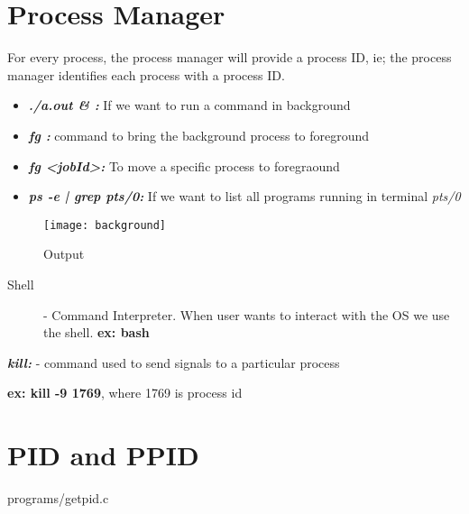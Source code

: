 \documentclass[11pt,fleqn]{book} %
\begin{document}
\section{Process Manager}
For every process, the process manager will provide a process ID, ie; the process manager identifies each process with a process ID.

\begin{myremark}{}
\begin{itemize}
	\item \textit{\textbf{./a.out \& :}} If we want to run a command in background
	
	\item \textit{\textbf{fg :}} command to bring the background process to foreground
	
	\item \textit{\textbf{fg <jobId>: }} To move a specific process to foregraound
	
	\item \textit{\textbf{ps -e | grep pts/0: }} If we want to list all programs running in terminal \textit{pts/0}

\end{itemize}
\end{myremark}

\begin{figure}[h]
\centering\texttt{[image: background]}
\caption{Output}
\end{figure}

\begin{description}
	\item[Shell] - Command Interpreter. When user wants to interact with the OS we use the shell. \textbf{ex: bash}
\end{description}


\begin{myremark}{}
\textbf{\textit{kill: }} - command used to send signals to a particular process

\textbf{ex: kill -9 1769}, where 1769 is process id

\end{myremark}



\section{PID and PPID}

\begin{mycode}{programs/getpid.c}
\end{mycode}
\end{document}
